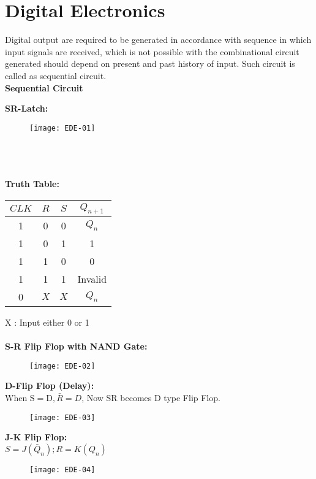 \chapter{Digital Electronics}
Digital output are required to be generated in accordance with sequence in which input signals are received, which is not possible with the combinational circuit generated should depend on present and past history of input. Such circuit is called as sequential circuit.\\
\textbf{Sequential Circuit}\\
\begin{minipage}{0.12\textwidth}
	\textbf{SR-Latch:}
\end{minipage}
\begin{minipage}{0.45\textwidth}
	\begin{figure}[H]
		\centering
		\texttt{[image: EDE-01]}
	\end{figure}
\end{minipage}\\\\\\
\textbf{Truth Table:}
\begin{tabular}{|c|c|c|c|}
	\hline$C L K$ & $R$ & $S$ & $Q_{n+1}$ \\
	\hline 1 & 0 & 0 & $Q_{n}$ \\
	\hline 1 & 0 & 1 & 1 \\
	\hline 1 & 1 & 0 & 0 \\
	\hline 1 & 1 & 1 & Invalid \\
	\hline 0 & $X$ & $X$ & $Q_{n}$ \\
	\hline
\end{tabular}
$\mathrm{X}$ : Input either 0 or 1\\\\
\textbf { S-R Flip Flop with NAND Gate: }
\begin{figure}[H]
	\centering
	\texttt{[image: EDE-02]}
\end{figure}
\textbf {D-Flip Flop (Delay): }\\
When $\mathrm{S}=\mathrm{D}, \bar{R}=D$, Now SR becomes $\mathrm{D}$ type Flip Flop.
\begin{figure}[H]
	\centering
	\texttt{[image: EDE-03]}
\end{figure}
\textbf { J-K Flip Flop: }\\
$S=J\left(\bar{Q}_{n}\right) ; R=K\left(Q_{n}\right)$
\begin{figure}[H]
	\centering
	\texttt{[image: EDE-04]}
\end{figure}
